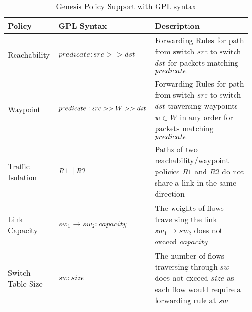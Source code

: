 \begin{table*}
	\begin{center}
		\begin{tabular}{||m{6em} | m{12em} | m{28em} ||} 
			\hline
			Policy &  GPL Syntax & Description \\ 
			\hline\hline
			Reachability & 	$predicate : src >> dst$ & Forwarding Rules for path from switch $src$ to switch $dst$ for packets matching $predicate$ \\
			\hline
			Waypoint & 	$predicate :\newline src >> W >> dst$ & Forwarding Rules for path from switch $src$ to switch $dst$ traversing waypoints $w \in W$ in any order for packets matching $predicate$ \\  
			\hline
			Traffic \newline Isolation & $R1 \ || \ R2$ & Paths of two reachability/waypoint policies $R1$ and $R2$ do not share a link in the same direction \\
			\hline
			Link \newline Capacity & $sw_1 \rightarrow sw_2 : capacity$  & The weights of flows traversing the link $sw_1 \rightarrow sw_2$ does not exceed $capacity$\\
			\hline
			Switch \newline Table Size & $sw : size$ & The number of flows traversing through $sw$ does not exceed $size$ as each flow would require a forwarding rule at $sw$ \\
			\hline\hline
		\end{tabular}
	\end{center}
	\caption{Genesis Policy Support with GPL syntax} \label{tab:policysupport} 
\end{table*}


